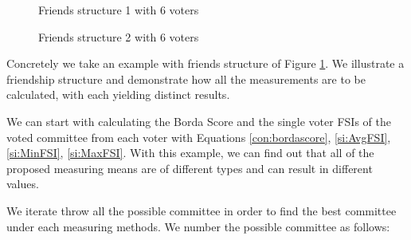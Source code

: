 \documentclass{article}
\begin{document}
\begin{example}
\begin{figure}[h]
\centering
{}
\caption{Friends structure 1 with 6 voters} \label{fig:Figure2}
\end{figure}

\begin{figure}[h]
\centering
{}
\caption{Friends structure 2 with 6 voters} \label{fig:Figure3}
\end{figure}

Concretely we take an example with friends structure of Figure \ref{fig:Figure2}. We illustrate a friendship structure and demonstrate how all the measurements are to be calculated, with each yielding distinct results. 
\end{example}

We can start with calculating the Borda Score  and the single voter FSIs of the voted committee from each voter with Equations \ref{con:bordascore}, \ref{si:AvgFSI}, \ref{si:MinFSI}, \ref{si:MaxFSI}. 
With this example, we can find out that all of the proposed measuring means are of different types and can result in different values. 

We iterate throw all the possible committee in order to find the best committee under each measuring methods. We number the possible committee as follows:
    
\end{document}
